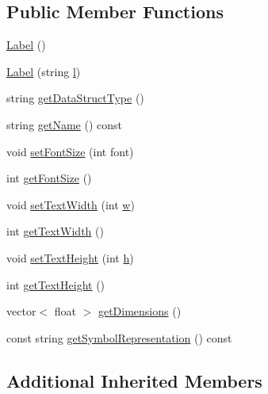 \subsection*{Public Member Functions}
\begin{DoxyCompactItemize}
\item 
\mbox{\hyperlink{classbridges_1_1_label_a6ecba5526127d5ed4d37bb38da560cc8}{Label}} ()
\item 
\mbox{\hyperlink{classbridges_1_1_label_a339ddf0650b3e2aa7383ab58cb61e8fa}{Label}} (string \mbox{\hyperlink{namespacebridges_acfb0a4f7877d8f63de3e6862004c50eda2db95e8e1a9267b7a1188556b2013b33}{l}})
\item 
string \mbox{\hyperlink{classbridges_1_1_label_a737053b6e94767959572f9985ea375c8}{get\+Data\+Struct\+Type}} ()
\item 
string \mbox{\hyperlink{classbridges_1_1_label_a3a55f3d7e0794401bfb1c43ea85e7c86}{get\+Name}} () const
\item 
void \mbox{\hyperlink{classbridges_1_1_label_aee9777172a46b4b2e099a4d1e317b6c1}{set\+Font\+Size}} (int font)
\item 
int \mbox{\hyperlink{classbridges_1_1_label_a630528ede3c5cc77548aeec886b92c1c}{get\+Font\+Size}} ()
\item 
void \mbox{\hyperlink{classbridges_1_1_label_ae7fc3629c3e1d18ceec6d96a9fa1f3a6}{set\+Text\+Width}} (int \mbox{\hyperlink{namespacebridges_acfb0a4f7877d8f63de3e6862004c50edaf1290186a5d0b1ceab27f4e77c0c5d68}{w}})
\item 
int \mbox{\hyperlink{classbridges_1_1_label_ae5259108e1d7c9aa63475a356e9759b7}{get\+Text\+Width}} ()
\item 
void \mbox{\hyperlink{classbridges_1_1_label_a0f12dc8d5530ae4c66e2be4974284d2b}{set\+Text\+Height}} (int \mbox{\hyperlink{namespacebridges_acfb0a4f7877d8f63de3e6862004c50eda2510c39011c5be704182423e3a695e91}{h}})
\item 
int \mbox{\hyperlink{classbridges_1_1_label_a65746c9728f3b4e0c4b5c4d9ab0d4ee1}{get\+Text\+Height}} ()
\item 
vector$<$ float $>$ \mbox{\hyperlink{classbridges_1_1_label_a97d5638f629edbd6733b8f8572ca42ba}{get\+Dimensions}} ()
\item 
const string \mbox{\hyperlink{classbridges_1_1_label_af4bdf9e492cf2a2bf3a8be42bd282b44}{get\+Symbol\+Representation}} () const
\end{DoxyCompactItemize}
\subsection*{Additional Inherited Members}


